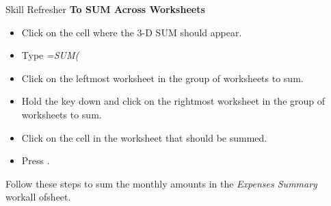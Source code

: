 \begin{center}
	\begin{sklbox}{Skill Refresher}
		\textbf{To SUM Across Worksheets}
		\\
		\begin{itemize}
			\setlength{\itemsep}{0pt}
			\setlength{\parskip}{0pt}
			\setlength{\parsep}{0pt}
			
			\item Click on the cell where the $ 3 $-D SUM should appear.
			\item Type \textit{=SUM(}
			\item Click on the leftmost worksheet in the group of worksheets to sum.
			\item Hold the  key down and click on the rightmost worksheet in the group of worksheets to sum.
			\item Click on the cell in the worksheet that should be summed.
			\item Press .
			
		\end{itemize}
	\end{sklbox}
\end{center}

Follow these steps to sum  the monthly amounts in the \textit{Expenses Summary} workall ofsheet.

